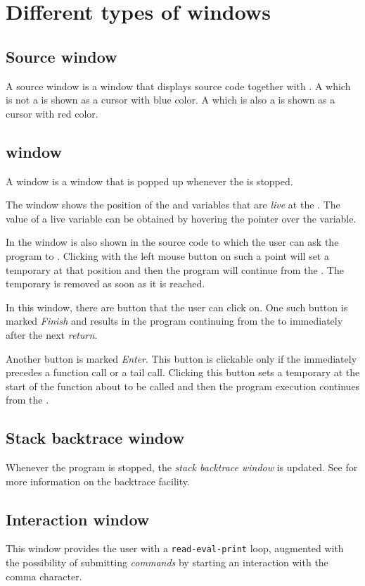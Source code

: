 \chapter{Different types of windows}

\section{Source window}
\label{sec-windows-source}

A source window is a window that displays source code together with
\pollpoints{}.  A \pollpoint{} which is not a \breakpoint{} is shown
as a cursor with blue color.  A \pollpoint{} which is also a
\breakpoint{} is shown as a cursor with red color.

\section{\Stoppingpoint{} window}
\label{sec-windows-stopping-point}

A \stoppingpoint{} window is a window that is popped up whenever 
the \applicationthread{} is stopped.

The \stoppingpoint{} window shows the position of the \stoppingpoint{}
and variables that are \emph{live} at the \stoppingpoint{}.  The value
of a live variable can be obtained by hovering the pointer over the
variable.

In the \stoppingpoint{} window is also shown \pollpoints{} in the
source code to which the user can ask the program to \emph{\dvance{}}.
Clicking with the left mouse button on such a point will set a
temporary \stoppingpoint{} at that position and then the program will
continue from the \stoppingpoint{}.  The temporary \stoppingpoint{} is
removed as soon as it is reached.

In this window, there are button that the user can click on.  One such
button is marked \emph{Finish} and results in the program continuing
from the \stoppingpoint{} to immediately after the next \emph{return}.

Another button is marked \emph{Enter}.  This button is clickable only
if the \stoppingpoint{} immediately precedes a function call or a tail
call.  Clicking this button sets a temporary \stoppingpoint{} at the
start of the function about to be called and then the program
execution continues from the \stoppingpoint{}.

\section{Stack backtrace window}

Whenever the program is stopped, the \emph{stack backtrace window} is
updated.  See  for more information on the
backtrace facility.

\section{Interaction window}

This window provides the user with a \texttt{read-eval-print} loop,
augmented with the possibility of submitting \emph{commands} by
starting an interaction with the comma character.
